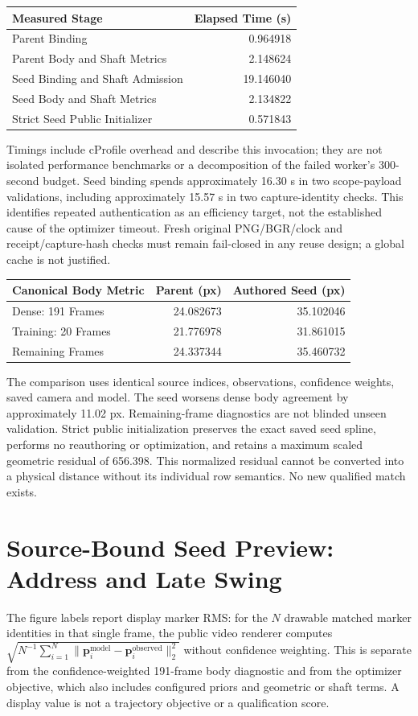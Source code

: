 \documentclass[11pt]{article}
\begin{document}
\begin{center}\small\begin{tabular}{lr}\toprule
Measured Stage & Elapsed Time (s)\\\midrule
Parent Binding & 0.964918\\
Parent Body and Shaft Metrics & 2.148624\\
Seed Binding and Shaft Admission & 19.146040\\
Seed Body and Shaft Metrics & 2.134822\\
Strict Seed Public Initializer & 0.571843\\
\bottomrule\end{tabular}\end{center}
Timings include cProfile overhead and describe this invocation; they are not isolated performance benchmarks or a decomposition of the failed worker's 300-second budget. Seed binding spends approximately 16.30 s in two scope-payload validations, including approximately 15.57 s in two capture-identity checks. This identifies repeated authentication as an efficiency target, not the established cause of the optimizer timeout. Fresh original PNG/BGR/clock and receipt/capture-hash checks must remain fail-closed in any reuse design; a global cache is not justified.

\begin{center}\small\begin{tabular}{lrr}\toprule
Canonical Body Metric & Parent (px) & Authored Seed (px)\\\midrule
Dense: 191 Frames & 24.082673 & 35.102046\\
Training: 20 Frames & 21.776978 & 31.861015\\
Remaining Frames & 24.337344 & 35.460732\\
\bottomrule\end{tabular}\end{center}
The comparison uses identical source indices, observations, confidence weights, saved camera and model. The seed worsens dense body agreement by approximately 11.02 px. Remaining-frame diagnostics are not blinded unseen validation. Strict public initialization preserves the exact saved seed spline, performs no reauthoring or optimization, and retains a maximum scaled geometric residual of 656.398. This normalized residual cannot be converted into a physical distance without its individual row semantics. No new qualified match exists.

\newpage
\section*{Source-Bound Seed Preview: Address and Late Swing}
The figure labels report display marker RMS: for the $N$ drawable matched marker identities in that single frame, the public video renderer computes $\sqrt{N^{-1}\sum_{i=1}^{N}\lVert\mathbf{p}^{\mathrm{model}}_i-\mathbf{p}^{\mathrm{observed}}_i\rVert_2^2}$ without confidence weighting. This is separate from the confidence-weighted 191-frame body diagnostic and from the optimizer objective, which also includes configured priors and geometric or shaft terms. A display value is not a trajectory objective or a qualification score.
\end{document}
